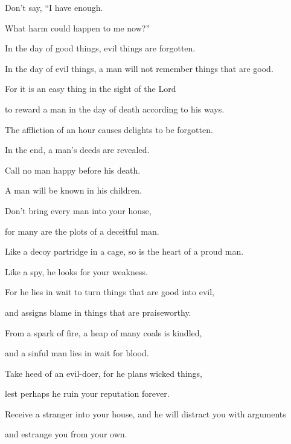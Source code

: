 {\par }{\Q {}Don’t say, “I have enough.
\par }{\QB What harm could happen to me now?”
\par }{\Q {}In the day of good things, evil things are forgotten.
\par }{\QB In the day of evil things, a man will not remember things that are good.
\par }{\Q {}For it is an easy thing in the sight of the Lord
\par }{\QB to reward a man in the day of death according to his ways.
\par }{\Q {}The affliction of an hour causes delights to be forgotten.
\par }{\QB In the end, a man’s deeds are revealed.
\par }{\Q {}Call no man happy before his death.
\par }{\QB A man will be known in his children.
\par }{\BB \par }{\Q {}Don’t bring every man into your house,
\par }{\QB for many are the plots of a deceitful man.
\par }{\Q {}Like a decoy partridge in a cage, so is the heart of a proud man.
\par }{\QB Like a spy, he looks for your weakness.
\par }{\Q {}For he lies in wait to turn things that are good into evil,
\par }{\QB and assigns blame in things that are praiseworthy.
\par }{\Q {}From a spark of fire, a heap of many coals is kindled,
\par }{\QB and a sinful man lies in wait for blood.
\par }{\Q {}Take heed of an evil-doer, for he plans wicked things,
\par }{\QB lest perhaps he ruin your reputation forever.
\par }{\Q {}Receive a stranger into your house, and he will distract you with arguments
\par }{\QB and estrange you from your own.
\par }{\BB \par }
